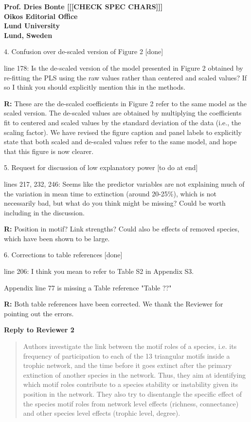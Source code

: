 \documentclass[12pt]{letter}
\begin{document}
\begin{letter}{\bf Prof. Dries Bonte [[[CHECK SPEC CHARS]]]\\
Oikos Editorial Office \\
Lund University \\
Lund, Sweden}
\begin{quotation}
    \end{quotation}

  4. Confusion over de-scaled version of Figure 2 [done]

    line 178: Is the de-scaled version of the model presented in Figure 2 obtained by re-fitting the PLS using the raw values rather than centered and scaled values? If so I think you should explicitly mention this in the methods.   


    \textbf{R:} These are the de-scaled coefficients in Figure 2 refer to the same model as the scaled version. The de-scaled values are obtained by multiplying the coefficients fit to centered and scaled values by the standard deviation of the data (i.e., the scaling factor). We have revised the figure caption and panel labels to explicitly state that both scaled and de-scaled values refer to the same model, and hope that this figure is now clearer.


  5. Request for discussion of low explanatory power [to do at end]

    lines 217, 232, 246: Seems like the predictor variables are not explaining much of the variation in mean time to extinction (around 20-25\%), which is not necessarily bad, but what do you think might be missing? Could be worth including in the discussion.

    \textbf{R:}
    Position in motif? Link strengths? Could also be effects of removed species, which have been shown to be large.


  6. Corrections to table references [done]

    line 206: I think you mean to refer to Table S2 in Appendix S3.

    Appendix line 77 is missing a Table reference "Table ??"

    \textbf{R:} Both table references have been corrected. We thank the Reviewer for pointing out the errors.


\clearpage

\Large{\textbf{Reply to Reviewer 2}}

  \begin{quotation}
  Authors investigate the link between the motif roles of a species, i.e. its frequency of participation to each of the 13 triangular motifs inside a trophic network, and the time before it goes extinct after the primary extinction of another species in the network. Thus, they aim at identifying which motif roles contribute to a species stability or instability given its position in the network. They also try to disentangle the specific effect of the species motif roles from network level effects (richness, connectance) and other species level effects (trophic level, degree).



\end{quotation}
\end{letter}
\end{document}
